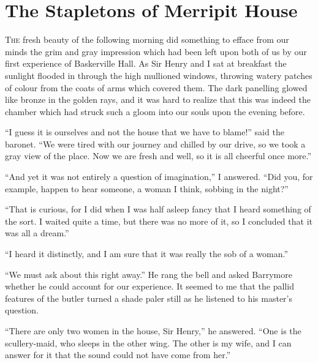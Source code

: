 \documentclass[paper=a5,BCOR=7mm,twoside,DIV=calc,12pt,usegeometry,openany,chapterprefix,endperiod,headings=big]{scrbook} %
\begin{document}
\chapter{The Stapletons of Merripit House}
\lettrine[lines=1]{T}{he} fresh beauty of the following morning did something to efface from our minds the grim and gray impression which had been left upon both of us by our first experience of Baskerville Hall. As Sir Henry and I sat at breakfast the sunlight flooded in through the high mullioned windows, throwing watery patches of colour from the coats of arms which covered them. The dark panelling glowed like bronze in the golden rays, and it was hard to realize that this was indeed the chamber which had struck such a gloom into our souls upon the evening before.

\enquote{I guess it is ourselves and not the house that we have to blame!} said the baronet. \enquote{We were tired with our journey and chilled by our drive, so we took a gray view of the place. Now we are fresh and well, so it is all cheerful once more.}

\enquote{And yet it was not entirely a question of imagination,} I an\-swered. \enquote{Did you, for example, happen to hear someone, a woman I think, sobbing in the night?}

\enquote{That is curious, for I did when I was half asleep fancy that I heard something of the sort. I waited quite a time, but there was no more of it, so I concluded that it was all a dream.}

\enquote{I heard it distinctly, and I am sure that it was really the sob of a woman.}

\enquote{We must ask about this right away.} He rang the bell and asked Barrymore whether he could account for our experience. It seemed to me that the pallid features of the butler turned a shade paler still as he listened to his master's question.

\enquote{There are only two women in the house, Sir Henry,} he an\-swered. \enquote{One is the scullery-maid, who sleeps in the other wing. The other is my wife, and I can answer for it that the sound could not have come from her.}
\end{document}

